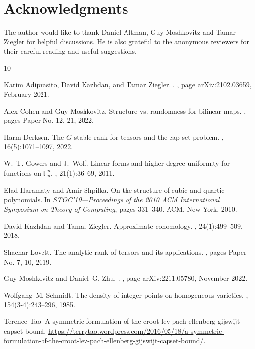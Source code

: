 \documentclass{daj}
\begin{document}
\section*{Acknowledgments} %
The author would like to thank Daniel Altman, Guy Moshkovitz and Tamar Ziegler for helpful discussions. He is also grateful to the anonymous reviewers for their careful reading and useful suggestions.


\begin{thebibliography}{10}

Karim {Adiprasito}, David {Kazhdan}, and Tamar {Ziegler}.
.
, page arXiv:2102.03659, February 2021.

Alex Cohen and Guy Moshkovitz.
\newblock Structure vs. randomness for bilinear maps.
, pages Paper No. 12, 21, 2022.

Harm Derksen.
\newblock The {$G$}-stable rank for tensors and the cap set problem.
, 16(5):1071--1097, 2022.

W.~T. Gowers and J.~Wolf.
\newblock Linear forms and higher-degree uniformity for functions on {$\mathbb{F}^n_p$}.
, 21(1):36--69, 2011.

Elad Haramaty and Amir Shpilka.
\newblock On the structure of cubic and quartic polynomials.
\newblock In {\em S{TOC}'10---{P}roceedings of the 2010 {ACM} {I}nternational {S}ymposium on {T}heory of {C}omputing}, pages 331--340. ACM, New York, 2010.

David Kazhdan and Tamar Ziegler.
\newblock Approximate cohomology.
, 24(1):499--509, 2018.

Shachar Lovett.
\newblock The analytic rank of tensors and its applications.
, pages Paper No. 7, 10, 2019.

Guy {Moshkovitz} and Daniel~G. {Zhu}.
.
, page arXiv:2211.05780, November 2022.

Wolfgang~M. Schmidt.
\newblock The density of integer points on homogeneous varieties.
, 154(3-4):243--296, 1985.

Terence Tao.
\newblock A symmetric formulation of the croot-lev-pach-ellenberg-gijswijt capset bound.
\newblock \url{https://terrytao.wordpress.com/2016/05/18/a-symmetric-formulation-of-the-croot-lev-pach-ellenberg-gijswijt-capset-bound/}.

\end{thebibliography}
\end{document}
